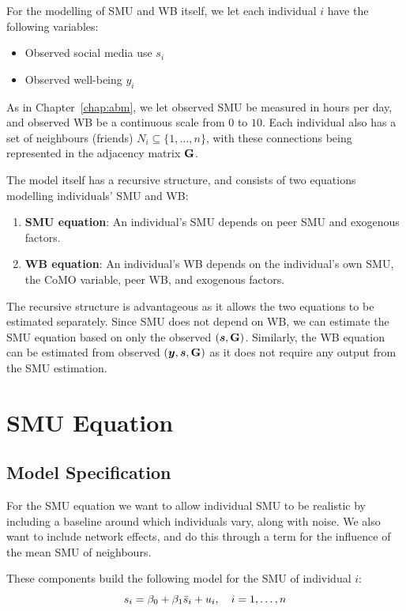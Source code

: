 For the modelling of SMU and WB itself, we let each individual $i$ have the following variables:
\begin{itemize}
    \item Observed social media use $s_i$
    \item Observed well-being $y_i$
\end{itemize}

As in Chapter~\ref{chap:abm}, we let observed SMU be measured in hours per day, and observed WB be a continuous scale from $0$ to $10$. Each individual also has a set of neighbours (friends) $N_i \subseteq \{1, \ldots, n\}$, with these connections being represented in the adjacency matrix $\mathbf{G}$.

The model itself has a recursive structure, and consists of two equations modelling individuals' SMU and WB:
\begin{enumerate}
    \item \textbf{SMU equation}: An individual's SMU depends on peer SMU and exogenous factors.
    \item \textbf{WB equation}: An individual's WB depends on the individual's own SMU, the CoMO variable, peer WB, and exogenous factors.
\end{enumerate}

The recursive structure is advantageous as it allows the two equations to be estimated separately. Since SMU does not depend on WB, we can estimate the SMU equation based on only the observed $(\bm{s}, \mathbf{G})$. Similarly, the WB equation can be estimated from observed $(\bm{y}, \bm{s}, \mathbf{G})$ as it does not require any output from the SMU estimation.

\section{SMU Equation}
\label{sec:model:screen}
\subsection{Model Specification}

For the SMU equation we want to allow individual SMU to be realistic by including a baseline around which individuals vary, along with noise. We also want to include network effects, and do this through a term for the influence of the mean SMU of neighbours.

These components build the following model for the SMU of individual $i$:
\begin{equation}
\label{eq:screen_time}
    s_i = \beta_0 + \beta_1 \bar{s}_i + u_i, \quad i = 1, \ldots, n
\end{equation}

